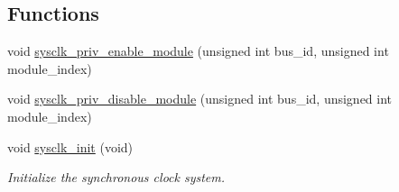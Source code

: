 \subsection*{\-Functions}
\begin{DoxyCompactItemize}
\item 
void \hyperlink{group__sysclk__group_ga74da4af4f93582fe3dd33dd75596cdf4}{sysclk\-\_\-priv\-\_\-enable\-\_\-module} (unsigned int bus\-\_\-id, unsigned int module\-\_\-index)
\item 
void \hyperlink{group__sysclk__group_ga9d3035baba081035de71adb2dd059ce7}{sysclk\-\_\-priv\-\_\-disable\-\_\-module} (unsigned int bus\-\_\-id, unsigned int module\-\_\-index)
\item 
void \hyperlink{group__sysclk__group_ga242399e48a97739c88b4d0c00f6101de}{sysclk\-\_\-init} (void)
\begin{DoxyCompactList}\small\item\em \-Initialize the synchronous clock system. \end{DoxyCompactList}\end{DoxyCompactItemize}
